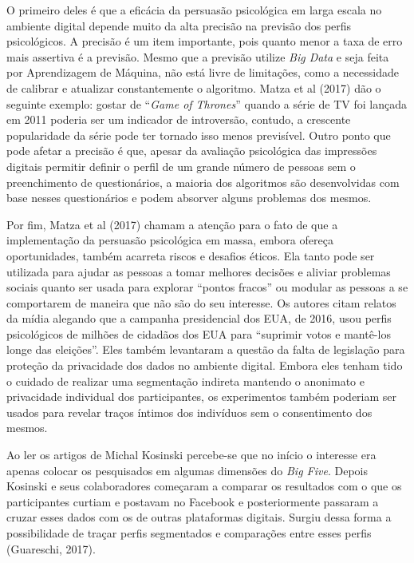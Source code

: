 O primeiro deles é que a eficácia da persuasão psicológica em larga
escala no ambiente digital depende muito da alta precisão na previsão
dos perfis psicológicos. A precisão é um item importante, pois quanto
menor a taxa de erro mais assertiva é a previsão. Mesmo que a previsão
utilize \emph{Big Data} e seja feita por Aprendizagem de Máquina, não
está livre de limitações, como a necessidade de calibrar e atualizar
constantemente o algoritmo. Matza et al (2017) dão o seguinte exemplo:
gostar de ``\emph{Game of Thrones}'' quando a série de TV foi lançada em
2011 poderia ser um indicador de introversão, contudo, a crescente
popularidade da série pode ter tornado isso menos previsível. Outro
ponto que pode afetar a precisão é que, apesar da avaliação psicológica
das impressões digitais permitir definir o perfil de um grande número de
pessoas sem o preenchimento de questionários, a maioria dos algoritmos
são desenvolvidas com base nesses questionários e podem absorver alguns
problemas dos mesmos.

Por fim, Matza et al (2017) chamam a atenção para o fato de que a
implementação da persuasão psicológica em massa, embora ofereça
oportunidades, também acarreta riscos e desafios éticos. Ela tanto pode
ser utilizada para ajudar as pessoas a tomar melhores decisões e aliviar
problemas sociais quanto ser usada para explorar ``pontos fracos'' ou
modular as pessoas a se comportarem de maneira que não são do seu
interesse. Os autores citam relatos da mídia alegando que a campanha
presidencial dos EUA, de 2016, usou perfis psicológicos de milhões de
cidadãos dos EUA para ``suprimir votos e mantê-los longe das eleições''.
Eles também levantaram a questão da falta de legislação para proteção da
privacidade dos dados no ambiente digital. Embora eles tenham tido o
cuidado de realizar uma segmentação indireta mantendo o anonimato e
privacidade individual dos participantes, os experimentos também
poderiam ser usados para revelar traços íntimos dos indivíduos sem o
consentimento dos mesmos.

Ao ler os artigos de Michal Kosinski percebe-se que no início o
interesse era apenas colocar os pesquisados em algumas dimensões do
\emph{Big Five}. Depois Kosinski e seus colaboradores começaram a
comparar os resultados com o que os participantes curtiam e postavam no
Facebook e posteriormente passaram a cruzar esses dados com os de outras
plataformas digitais. Surgiu dessa forma a possibilidade de traçar
perfis segmentados e comparações entre esses perfis (Guareschi, 2017).

